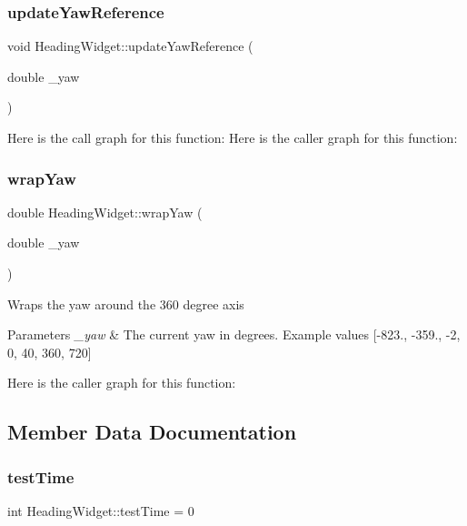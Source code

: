 \subsubsection{\texorpdfstring{update\+Yaw\+Reference}{updateYawReference}}
{\footnotesize\ttfamily void Heading\+Widget\+::update\+Yaw\+Reference (\begin{DoxyParamCaption}\item[{double}]{\+\_\+yaw }\end{DoxyParamCaption})\hspace{0.3cm}{\ttfamily [slot]}}

Here is the call graph for this function\+:
Here is the caller graph for this function\+:
\mbox{\label{class_heading_widget_a049dfd0b5fc1ad2d771130bde8516ab2}} 
\subsubsection{\texorpdfstring{wrap\+Yaw}{wrapYaw}}
{\footnotesize\ttfamily double Heading\+Widget\+::wrap\+Yaw (\begin{DoxyParamCaption}\item[{double}]{\+\_\+yaw }\end{DoxyParamCaption})\hspace{0.3cm}{\ttfamily [slot]}}

Wraps the yaw around the 360 degree axis 
\begin{DoxyParams}{Parameters}
{\em \+\_\+yaw} & The current yaw in degrees. Example values \mbox{[}-\/823., -\/359., -\/2, 0, 40, 360, 720\mbox{]} \\
\hline
\end{DoxyParams}
Here is the caller graph for this function\+:


\subsection{Member Data Documentation}
\mbox{\label{class_heading_widget_a58c79d82beb843206d865256f45a3bde}} 
\subsubsection{\texorpdfstring{test\+Time}{testTime}}
{\footnotesize\ttfamily int Heading\+Widget\+::test\+Time = 0}

